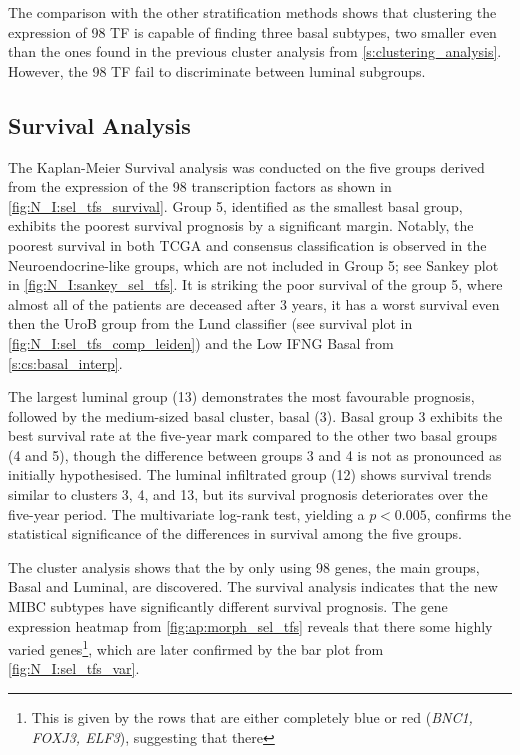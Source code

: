 The comparison with the other stratification methods shows that clustering the expression of 98 TF is capable of finding three basal subtypes, two smaller even than the ones found in the previous cluster analysis from \cref{s:clustering_analysis}. However, the 98 TF fail to discriminate between luminal subgroups.

\subsection{Survival Analysis}

The Kaplan-Meier Survival analysis was conducted on the five groups derived from the expression of the 98 transcription factors as shown in \cref{fig:N_I:sel_tfs_survival}. Group 5, identified as the smallest basal group, exhibits the poorest survival prognosis by a significant margin. Notably, the poorest survival in both TCGA and consensus classification is observed in the Neuroendocrine-like groups, which are not included in Group 5; see Sankey plot in \cref{fig:N_I:sankey_sel_tfs}. It is striking the poor survival of the group 5, where almost all of the patients are deceased after 3 years, it has a worst survival even then the UroB group from the Lund classifier (see survival plot in \cref{fig:N_I:sel_tfs_comp_leiden}) and the Low IFNG Basal from \cref{s:cs:basal_interp}.

The largest luminal group (13) demonstrates the most favourable prognosis, followed by the medium-sized basal cluster, basal (3). Basal group 3 exhibits the best survival rate at the five-year mark compared to the other two basal groups (4 and 5), though the difference between groups 3 and 4 is not as pronounced as initially hypothesised. The luminal infiltrated group (12) shows survival trends similar to clusters 3, 4, and 13, but its survival prognosis deteriorates over the five-year period. The multivariate log-rank test, yielding a $p<0.005$, confirms the statistical significance of the differences in survival among the five groups.


The cluster analysis shows that the by only using 98 genes, the main groups, Basal and Luminal, are discovered. The survival analysis indicates that the new MIBC subtypes have significantly different survival prognosis. The gene expression heatmap from \cref{fig:ap:morph_sel_tfs} reveals that there some highly varied genes\footnote{This is given by the rows that are either completely blue or red (\textit{BNC1, FOXJ3, ELF3}), suggesting that there }, which are later confirmed by the bar plot from \cref{fig:N_I:sel_tfs_var}. 


